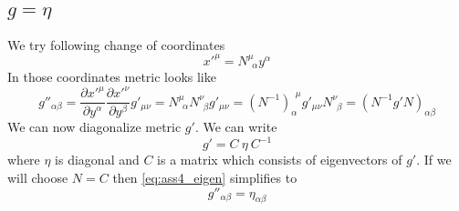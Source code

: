 \subsection{\texorpdfstring{$g=\eta$}{TEXT}}

We try following change of coordinates
%
\begin{equation}
    x'^\mu = N_{~~\alpha}^{\mu~~} y^\alpha
\end{equation}
%
In those coordinates metric looks like
%
\begin{equation}
    g''_{\alpha\beta} =
    \frac{\partial x'^\mu}{\partial y^\alpha}
    \frac{\partial x'^\nu}{\partial y^\beta} g'_{\mu\nu} =
    N^{\mu~~}_{~~\alpha} N^{\nu~~}_{~~\beta} g'_{\mu\nu} =
    (N^{-1})^{~~\mu}_{\alpha~~} g'_{\mu\nu} N^{\nu~~}_{~~\beta} =
    (N^{-1} g' N)_{\alpha\beta}
    \label{eq:ass4_eigen}
\end{equation}
%
We can now diagonalize metric $g'$. We can write
%
\begin{equation}
    g' = C~\eta~C^{-1}
\end{equation}
%
where $\eta$ is diagonal and $C$ is a matrix which consists of eigenvectors of
$g'$. If we will choose $N=C$ then \autoref{eq:ass4_eigen} simplifies to
%
\begin{equation}
    \boxed{g''_{\alpha\beta} = \eta_{\alpha\beta}}
\end{equation}